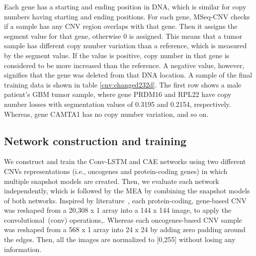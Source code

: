 \hspace*{3.5mm} Each gene has a starting and ending position in DNA, which is similar for copy numbers having starting and ending positions. For each gene, MSeq-CNV checks if a sample has any CNV region overlaps with that gene. Then it assigns the segment value for that gene, otherwise 0 is assigned. This means that a tumor sample has different copy number variation than a reference, which is measured by the segment value. If the value is positive, copy number in that gene is considered to be more increased than the reference. A negative value, however, signifies that the gene was deleted from that DNA location. A sample of the final training data is shown in table \ref{cnv:changed232d}. The first row shows a male patient's GBM tumor sample, where gene PRDM16 and RPL22 have copy number losses with segmentation values of 0.3195 and 0.2154, respectively. Whereas, gene CAMTA1 has no copy number variation, and so on. %

\subsection{Network construction and training}
\label{nc}
We construct and train the Conv-LSTM and CAE networks using two different CNVs representations (i.e., oncogenes and protein-coding genes) in which multiple snapshot models are created. Then, we evaluate each network independently, which is followed by the MEA by combining the snapshot models of both networks. Inspired by literature~\cite{lyu2018deep}, each protein-coding, gene-based CNV was reshaped from a 20,308 x 1 array into a 144 x 144 image, to apply the convolutional~(conv) operations,. Whereas each oncogenes-based CNV sample was reshaped from a 568 x 1 array into 24 x 24 by adding zero padding around the edges. Then, all the images are normalized to [0,255] without losing any information. 

